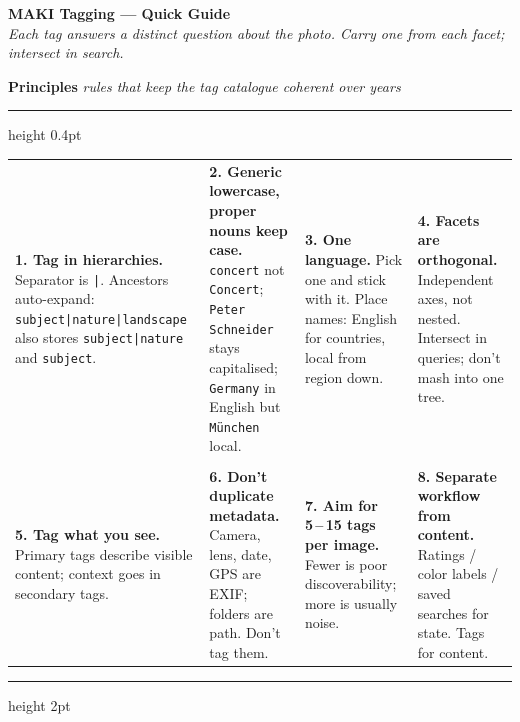 \documentclass[a3paper,landscape,10pt]{article}
\newcommand{\cmd}[1]{\texttt{\small #1}}
\newcommand{\secthead}[2]{%
  \textcolor{maki-salmon}{\bfseries\normalsize #1}\hspace{1em}%
  \textcolor{maki-stone}{\footnotesize\itshape #2}\\[2pt]%
  {\color{maki-salmon!40}\hrule height 0.4pt}\vspace{6pt}%
}
\begin{document}
\begin{center}
  {\Huge\bfseries\color{maki-salmon} MAKI Tagging — Quick Guide}\\[2pt]
  {\small\color{maki-stone}\itshape Each tag answers a distinct question about the photo. Carry one from each facet; intersect in search.}
\end{center}
\vspace{4pt}

\secthead{Principles}{rules that keep the tag catalogue coherent over years}

\renewcommand{\arraystretch}{1.15}
\begin{tabularx}{\textwidth}{@{}>{\RaggedRight\arraybackslash}X >{\RaggedRight\arraybackslash}X >{\RaggedRight\arraybackslash}X >{\RaggedRight\arraybackslash}X@{}}
  \textbf{\color{maki-nori}1. Tag in hierarchies.} Separator is \cmd{|}. Ancestors auto-expand: \cmd{subject|nature|landscape} also stores \cmd{subject|nature} and \cmd{subject}. &
  \textbf{\color{maki-nori}2. Generic lowercase, proper nouns keep case.} \cmd{concert} not \cmd{Concert}; \cmd{Peter Schneider} stays capitalised; \cmd{Germany} in English but \cmd{München} local. &
  \textbf{\color{maki-nori}3. One language.} Pick one and stick with it. Place names: English for countries, local from region down. &
  \textbf{\color{maki-nori}4. Facets are orthogonal.} Independent axes, not nested. Intersect in queries; don't mash into one tree. \\[10pt]
  \multicolumn{4}{@{}l@{}}{\color{maki-cream!70!maki-stone}\rule{\textwidth}{0.4pt}} \\[8pt]
  \textbf{\color{maki-nori}5. Tag what you see.} Primary tags describe visible content; context goes in secondary tags. &
  \textbf{\color{maki-nori}6. Don't duplicate metadata.} Camera, lens, date, GPS are EXIF; folders are path. Don't tag them. &
  \textbf{\color{maki-nori}7. Aim for 5\,--\,15 tags per image.} Fewer is poor discoverability; more is usually noise. &
  \textbf{\color{maki-nori}8. Separate workflow from content.} Ratings / color labels / saved searches for state. Tags for content. \\
\end{tabularx}

\vspace{14pt}
{\color{maki-cream}\hrule height 2pt}
\vspace{10pt}
\end{document}
